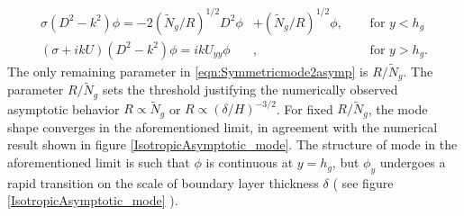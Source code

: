 \documentclass[12pt]{report}   %
\newcommand{\hg}{h_g}
\newcommand{\Rey}{{R}}
\newcommand{\Ndg}{\tilde{N}_g}
\begin{document}
\begin{subequations}
\begin{align}
\sigma\left( D^2-k^2\right)\phi = -2{(\Ndg/\Rey)^{1/2}}D^2\phi &+ (\Ndg/R)^{1/2} \phi,  \quad &\text{ for } y<\hg  \label{eqn:mode2asympa} \\
\left(\sigma+ikU\right) \left(D^2-k^2\right)\phi =  ikU_{yy}\phi &, \quad &\text{ for } y>\hg. \label{eqn:mode2asympb}
\end{align}
\label{eqn:Symmetricmode2asymp}
\end{subequations}
The only remaining parameter in \eqref{eqn:Symmetricmode2asymp} is $\Rey/\Ndg$. The parameter $\Rey/\Ndg$ sets the threshold justifying the numerically observed asymptotic behavior $\Rey \propto \Ndg $ or $ \Rey \propto (\delta/H)^{-3/2}$. For fixed $\Rey/\Ndg$, the mode shape converges in the aforementioned limit, in agreement with the numerical result shown in figure \ref{IsotropicAsymptotic_mode}. The structure of mode in the aforementioned limit is such that $\phi$ is continuous at $y=h_g$, but $\phi_y$ undergoes a rapid transition on the scale of boundary layer thickness $\delta$ 
( see figure \ref{IsotropicAsymptotic_mode} ).
\end{document}
